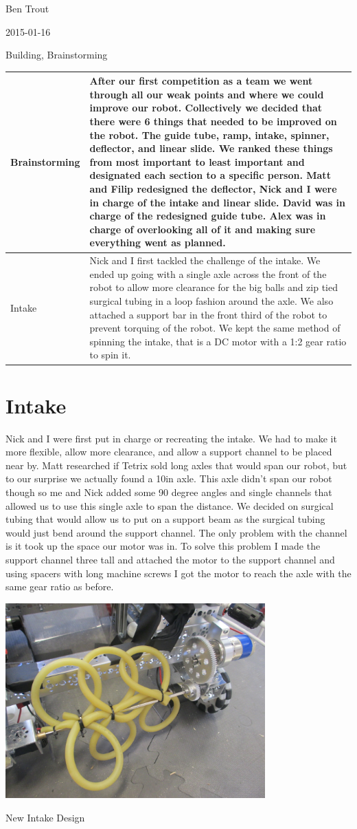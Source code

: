 Ben Trout

2015-01-16

Building, Brainstorming

\begin{tabular}{|p{5cm}|p{5cm}|}
\hline
Brainstorming&
After our first competition as a team we went through all our weak points and where we could improve our robot. Collectively we decided that there were 6 things that needed to be improved on the robot. The guide tube, ramp, intake, spinner, deflector, and linear slide. We ranked these things from most important to least important and designated each section to a specific person. Matt and Filip redesigned the deflector, Nick and I were in charge of the intake and linear slide. David was in charge of the redesigned guide tube. Alex was in charge of overlooking all of it and making sure everything went as planned.
\\
\hline
Intake&
Nick and I first tackled the challenge of the intake. We ended up going with a single axle across the front of the robot to allow more clearance for the big balls and zip tied surgical tubing in a loop fashion around the axle. We also attached a support bar in the front third of the robot to prevent torquing of the robot. We kept the same method of spinning the intake, that is a DC motor with a 1:2 gear ratio to spin it.
\\
\hline
\end{tabular}

\section*{Intake}
Nick and I were first put in charge or recreating the intake. We had to make it more flexible, allow more clearance, and allow a support channel to be placed near by. Matt researched if Tetrix sold long axles that would span our robot, but to our surprise we actually found a 10in axle. This axle didn’t span our robot though so me and Nick added some 90 degree angles and single channels that allowed us to use this single axle to span the distance. We decided on surgical tubing that would allow us to put on a support beam as the surgical tubing would just bend around the support channel. The only problem with the channel is it took up the space our motor was in. To solve this problem I made the support channel three tall and attached the motor to the support channel and using spacers with long machine screws I got the motor to reach the axle with the same gear ratio as before.

\begin{center}
\includegraphics[width=10cm]{./Entries/Images/SurgicalIntake.JPG}
\end{center}

New Intake Design
